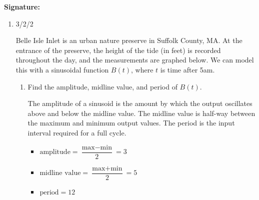 \documentclass{article}
\begin{document}
\vfill

\vspace{0.3in}

{\large \mbox{} \hfill \bf Signature:\underline{\hspace{3in}}}
\thispagestyle{empty}

\newpage

\begin{enumerate}

\item

\begin{grading}
    3/2/2
\end{grading}

 Belle Isle Inlet is an urban nature preserve in Suffolk County, MA. At the entrance of the preserve, the height of the tide (in feet) is recorded throughout the day, and the measurements are graphed below. We can model this with a sinusoidal function $B(t)$, where $t$ is time after 5am. 

        \begin{center}
        \end{center}


\begin{enumerate}
    \item 
    \begin{problem}
    Find the amplitude, midline value, and period of $B(t)$.
    \end{problem}
\pspace{1.5in}

\begin{solution}
The amplitude of a sinusoid is the amount by which the output oscillates above and below the midline value. The midline value is half-way between the maximum and minimum output values. The period is the input interval required for a full cycle.
    \begin{itemize}
        \item $\text{amplitude} = \dfrac{\text{max} - \text{min}}{2} = \boxed{3}$
        \item $\text{midline value} = \dfrac{\text{max} + \text{min}}{2} = \boxed{5}$
        \item $\text{period} = \boxed{12}$
    \end{itemize}
\end{solution}


\end{enumerate}
\end{enumerate}
\end{document}
